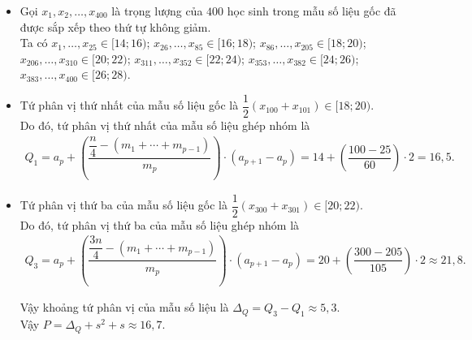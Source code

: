 \begin{ex}
{\begin{itemize}
			\item	Gọi $x_1, x_2, \dots, x_{400}$ là trọng lượng của $400$ học sinh trong mẫu số liệu gốc đã được sắp xếp theo thứ tự không giảm.\\
			Ta có $x_1, \dots, x_{25} \in [14; 16)$; $x_{26}, \dots, x_{85} \in [16; 18)$; $x_{86}, \dots, x_{205} \in [18; 20)$; $x_{206}, \dots, x_{310} \in [20; 22)$; $x_{311}, \dots, x_{352} \in [22; 24)$; $x_{353}, \dots, x_{382} \in [24; 26)$; $x_{383}, \dots, x_{400} \in [26; 28)$.
			\item	Tứ phân vị thứ nhất của mẫu số liệu gốc là $\dfrac{1}{2}(x_{100} + x_{101}) \in [18; 20)$.\\
			Do đó, tứ phân vị thứ nhất của mẫu số liệu ghép nhóm là
			\begin{align*}
				Q_1=a_{p}+\left(\dfrac{\dfrac{n}{4}-\left(m_1+\cdots+m_{p-1}\right)}{m_{p}}\right)\cdot\left(a_{p+1}-a_{p}\right)
				=14+\left(\dfrac{100-25}{60}\right)\cdot2=16{,}5.
			\end{align*}
			\item  Tứ phân vị thứ ba của mẫu số liệu gốc là $\dfrac{1}{2}(x_{300} + x_{301}) \in [20; 22)$.\\
			Do đó, tứ phân vị thứ ba của mẫu số liệu ghép nhóm là
			\begin{align*}
				Q_{3}=a_{p}+\left(\dfrac{\dfrac{3 n}{4}-\left(m_1+\cdots+m_{p-1}\right)}{m_{p}}\right)\cdot\left(a_{p+1}-a_{p}\right)
				=20+\left(\dfrac{300-205}{105}\right)\cdot 2\approx 21{,}8.
			\end{align*}
			
			Vậy khoảng tứ phân vị của mẫu số liệu là $\Delta _Q = Q_3 - Q_1  \approx 5{,}3$.\\
			Vậy $P=\Delta _Q+s^2+s \approx 16{,}7$.
		\end{itemize}
	}
\end{ex}

